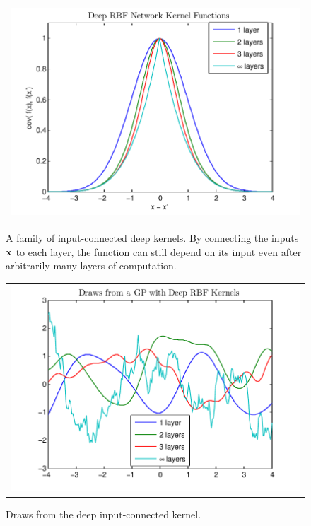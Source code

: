 \documentclass[twoside]{article}
\begin{document}
\begin{figure}[h]
\centering
\begin{tabular}{c}
\hspace{-0.5cm}\includegraphics[width=\columnwidth, clip, trim = 0cm 0cm 1cm 0.61cm]{figures/deep_kernel_connected}
\end{tabular}
\caption{
A family of input-connected deep kernels.  By connecting the inputs ${\bf{x}}$ to each layer, the function can still depend on its input even after arbitrarily many layers of computation.}
\label{fig:deep_kernel_connected}
\end{figure}


\begin{figure}[h]
\centering
\begin{tabular}{c}
\hspace{-0.5cm}\includegraphics[width=\columnwidth, clip, trim = 0cm 0cm 1cm 0.61cm]{figures/deep_kernel_connected_draws} \\
\end{tabular}
\caption{Draws from the deep input-connected kernel.  
}
\label{fig:deep_kernel_connected_draws}
\end{figure}
\end{document}

